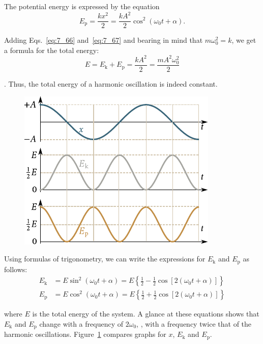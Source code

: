 \noindent
The potential energy is expressed by the equation
\begin{equation}\label{eq:7_67}
	E_{\text{p}} = \frac{kx^2}{2} = \frac{kA^2}{2}\cos^2(\omega_0 t + \alpha).
\end{equation}

\noindent
Adding Eqs.~\eqref{eq:7_66} and~\eqref{eq:7_67} and bearing in mind that $m\omega_0^2=k$, we get a formula for the total energy:
\begin{equation}\label{eq:7_68}
	E = E_{\text{k}} + E_{\text{p}}= \frac{kA^2}{2} = \frac{mA^2\omega_0^2}{2}
\end{equation}

. Thus, the total energy of a harmonic oscillation is indeed constant.

\begin{figure}[t]
	\begin{center}
		\includegraphics[scale=0.95]{figures/ch_07/fig_7_6.pdf}
		\caption[]{}
		\label{fig:7_6}
	\end{center}
	\vspace{-0.85cm}
\end{figure}

Using formulas of trigonometry, we can write the expressions for $E_{\text{k}}$ and $E_{\text{p}}$ as follows:
\begin{align}
	E_{\text{k}} &= E\sin^2(\omega_0 t + \alpha) = E \left\{\frac{1}{2} - \frac{1}{2}\cos[2(\omega_0 t + \alpha)]\right\}\label{eq:7_69}\\
	E_{\text{p}} &= E\cos^2(\omega_0 t + \alpha) = E \left\{\frac{1}{2} + \frac{1}{2}\cos[2(\omega_0 t + \alpha)]\right\}\label{eq:7_70}
\end{align}

\noindent
where $E$ is the total energy of the system. A glance at these equations shows that $E_{\text{k}}$ and $E_{\text{p}}$ change with a frequency of $2\omega_0$, \ie, with a frequency twice that of the harmonic oscillations. Figure~\ref{fig:7_6} compares graphs for $x$, $E_{\text{k}}$ and $E_{\text{p}}$.



